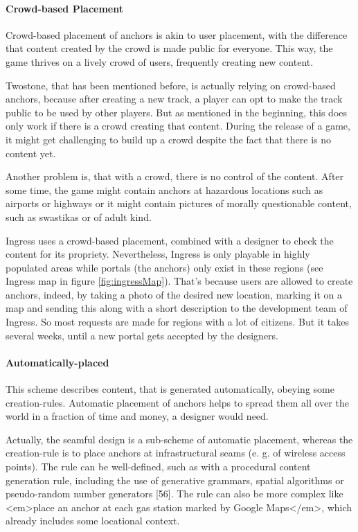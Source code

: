 \paragraph{Crowd-based Placement}
Crowd-based placement of anchors is akin to user placement, with the difference that content created by the crowd is made public for everyone. This way, the game thrives on a lively crowd of users, frequently creating new content.

Twostone, that has been mentioned before, is actually relying on crowd-based anchors, because after creating a new track, a player can opt to make the track public to be used by other players. But as mentioned in the beginning, this does only work if there is a crowd creating that content. During the release of a game, it might get challenging to build up a crowd despite the fact that there is no content yet.

Another problem is, that with a crowd, there is no control of the content. After some time, the game might contain anchors at hazardous locations such as airports or highways or it might contain pictures of morally questionable content, such as swastikas or of adult kind.

Ingress uses a crowd-based placement, combined with a designer to check the content for its propriety. Nevertheless, Ingress is only playable in highly populated areas while portals (the anchors) only exist in these regions (see Ingress map in figure \ref{fig:ingressMap}). That's because users are allowed to create anchors, indeed, by taking a photo of the desired new location, marking it on a map and sending this along with a short description to the development team of Ingress. So most requests are made for regions with a lot of citizens. But it takes several weeks, until a new portal gets accepted by the designers.

\paragraph{Automatically-placed}
This scheme describes content, that is generated automatically, obeying some creation-rules. Automatic placement of anchors helps to spread them all over the world in a fraction of time and money, a designer would need.

Actually, the seamful design is a sub-scheme of automatic placement, whereas the creation-rule is to place anchors at infrastructural seams (e. g. of wireless access points).
The rule can be well-defined, such as with a procedural content generation rule, including the use of generative grammars, spatial algorithms or pseudo-random number generators [56].
The rule can also be more complex like <em>place an anchor at each gas station marked by Google Maps</em>, which already includes some locational context.

